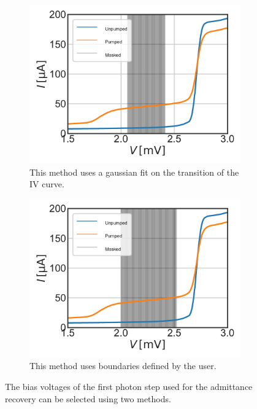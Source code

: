 \documentclass[]{article}
\begin{document}
\begin{figure}
	\centering              
	\begin{subfigure}[t]{0.49\textwidth}
		\centering
		\includegraphics[width=\linewidth]{./../Mixer_Unit_Test/2020_01_12_GausMask/Masked_Voltage_Region.pdf}
		\caption{This method uses a gaussian fit on the transition of the IV curve.}
	\end{subfigure}
	\begin{subfigure}[t]{0.49\textwidth}
		\centering
		\includegraphics[width=\linewidth]{./../Mixer_Unit_Test/2020_01_12_FixedMask/Masked_Voltage_Region.pdf}
		\caption{This method uses boundaries defined by the user.}
	\end{subfigure}
	\caption[]{The bias voltages of the first photon step used for the admittance recovery can be selected using two methods.
	}
	\label{fig:Masked_Photon_Steps}
\end{figure}
\end{document}

